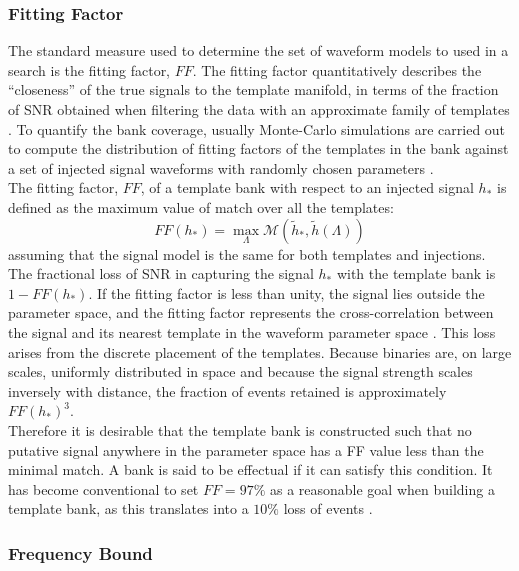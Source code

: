 \documentclass[binding=0.6cm, LaM]{sapthesis}
\begin{document}
\subsubsection{Fitting Factor}
\label{subsec:fittingfactor}
	The standard measure used to determine the set of waveform models to used in a
        search is the fitting factor, $FF$.
	The fitting factor quantitatively describes the ``closeness'' of 
	the true signals to the template manifold, in terms of the fraction of 
	SNR obtained when filtering 
	the data with an approximate family of templates \cite{31}. 
	To quantify the bank coverage, usually Monte-Carlo simulations are carried out   
	to compute the distribution of fitting factors of the templates in the bank against 
	a set of injected signal waveforms with randomly chosen parameters \cite{32}. \\
	The fitting factor, $FF$, of a template bank with respect to an injected signal $h_{*}$ 
	is defined as the maximum value of match over all the templates:
		\begin{equation}
			FF(h_{*}) = \max_\Lambda \mathcal{M}(\tilde{h}_{*}, \tilde{h}(\Lambda))
		\end{equation}
	assuming that the signal model is the same for both templates and injections. 
	The fractional loss of SNR in capturing the signal 
	$h_{*}$ with the template bank is $1 - FF(h_{*})$.
	If the fitting factor is less than unity, the signal lies outside the parameter space, 
	and the fitting factor represents the cross-correlation between 
	the signal and its nearest template in the waveform parameter space \cite{33}. 
	This loss arises from the discrete placement of the templates. 
	Because binaries are, on large scales, uniformly distributed in space 
	and because the signal strength scales inversely with distance, 
	the fraction of events retained is approximately $FF(h_*)^3$. \\ 
	Therefore it is desirable that the template bank is constructed such that 
	no putative signal anywhere in the parameter space
	has a FF value less than the minimal match. 
	A bank is said to be effectual if it can satisfy this condition.
	It has become conventional to set $FF = 97\%$ as a reasonable goal when building a template bank, 
	as this translates into a $10\%$ loss of events \cite{33}.

\subsubsection{Frequency Bound}
\end{document}
